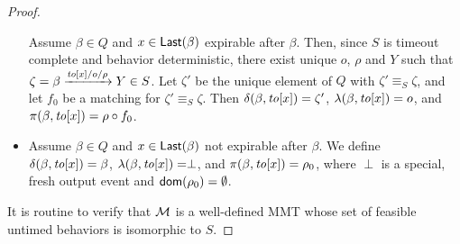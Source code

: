 \begin{proof}
\begin{itemize}
Assume $\beta \in Q$ and $x\in \mathsf{Last}({\beta})$ expirable after $\beta$. 
Then, since $S$ is  timeout complete and behavior deterministic, there exist unique
$o$, $\rho$ and $Y$ such that $\zeta = \beta \xrightarrow{\mathit{to}[x]/o/\rho} Y \in S$.
Let $\zeta'$ be the unique element of $Q$ with $\zeta' \equiv_S \zeta$, and
let $f_0$ be a matching for $\zeta' \equiv_S \zeta$.
Then $\delta(\beta,\mathit{to}[x]) = \zeta'$, $\lambda(\beta,\mathit{to}[x]) = o$, and $\pi(\beta,\mathit{to}[x]) = \rho \circ f_0$.
\item
Assume $\beta \in Q$ and $x \in \mathsf{Last}({\beta})$ not expirable after $\beta$.
We define $\delta(\beta,\mathit{to}[x]) = \beta$, $\lambda(\beta,\mathit{to}[x]) = \perp$, and $\pi(\beta,\mathit{to}[x]) = \rho_0$, 
where $\perp$ is a special, fresh output event and ${\textsf{dom}}(\rho_0) = \emptyset$.
\end{itemize}
It is routine to verify that ${\mathcal M}$ is a well-defined MMT whose set of feasible untimed behaviors is isomorphic to $S$.
\end{proof}
\fi